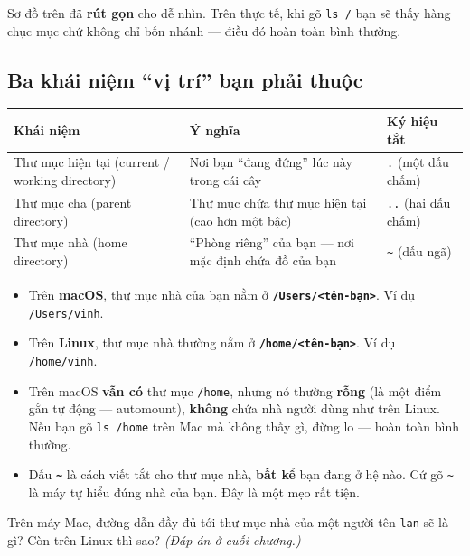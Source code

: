 \documentclass[12pt,a4paper]{article}
\newcommand{\hm}{\textasciitilde{}}
\begin{document}
Sơ đồ trên đã \textbf{rút gọn} cho dễ nhìn. Trên thực tế, khi gõ \texttt{ls /} bạn sẽ thấy hàng chục mục chứ không chỉ bốn nhánh --- điều đó hoàn toàn bình thường.

\subsection{Ba khái niệm ``vị trí'' bạn phải thuộc}

\renewcommand{\arraystretch}{1.4}
\begin{longtable}{>{\raggedright\arraybackslash}p{4.2cm} >{\raggedright\arraybackslash}p{7cm} >{\raggedright\arraybackslash}p{2.6cm}}
\rowcolor{checkback}
\textbf{Khái niệm} & \textbf{Ý nghĩa} & \textbf{Ký hiệu tắt} \\
\hline
\endhead
Thư mục hiện tại (current / working directory) & Nơi bạn ``đang đứng'' lúc này trong cái cây & \texttt{.} (một dấu chấm) \\
Thư mục cha (parent directory) & Thư mục chứa thư mục hiện tại (cao hơn một bậc) & \texttt{..} (hai dấu chấm) \\
Thư mục nhà (home directory) & ``Phòng riêng'' của bạn --- nơi mặc định chứa đồ của bạn & \texttt{\hm} (dấu ngã) \\
\end{longtable}
\renewcommand{\arraystretch}{1}

\begin{notebox}[title={Quan trọng --- khác biệt macOS vs Linux}]
\begin{itemize}[leftmargin=*]
  \item Trên \textbf{macOS}, thư mục nhà của bạn nằm ở \textbf{\texttt{/Users/<tên-bạn>}}. Ví dụ \texttt{/Users/vinh}.
  \item Trên \textbf{Linux}, thư mục nhà thường nằm ở \textbf{\texttt{/home/<tên-bạn>}}. Ví dụ \texttt{/home/vinh}.
  \item Trên macOS \textbf{vẫn có} thư mục \texttt{/home}, nhưng nó thường \textbf{rỗng} (là một điểm gắn tự động --- automount), \textbf{không} chứa nhà người dùng như trên Linux. Nếu bạn gõ \texttt{ls /home} trên Mac mà không thấy gì, đừng lo --- hoàn toàn bình thường.
  \item Dấu \textbf{\texttt{\hm}} là cách viết tắt cho thư mục nhà, \textbf{bất kể} bạn đang ở hệ nào. Cứ gõ \texttt{\hm} là máy tự hiểu đúng nhà của bạn. Đây là một mẹo rất tiện.
\end{itemize}
\end{notebox}

\begin{checkbox}[title={Tự kiểm tra 1}]
Trên máy Mac, đường dẫn đầy đủ tới thư mục nhà của một người tên \texttt{lan} sẽ là gì? Còn trên Linux thì sao? \textit{(Đáp án ở cuối chương.)}
\end{checkbox}
\end{document}
